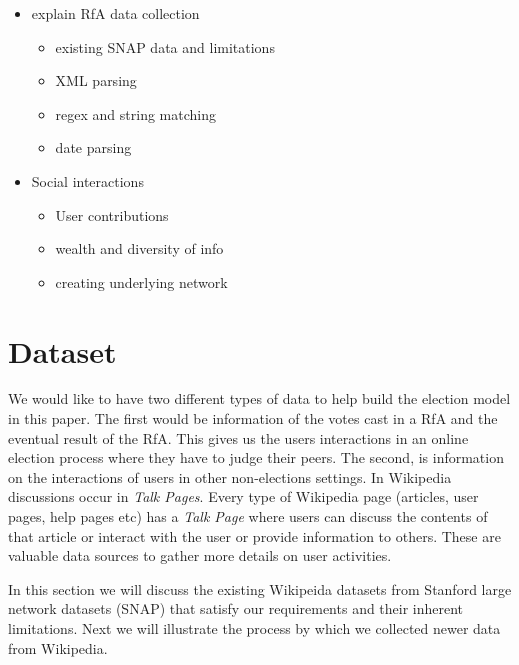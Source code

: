 \begin{itemize}
    \item explain RfA data collection 
    \begin{itemize}
        \item existing SNAP data and limitations
        \item XML parsing 
        \item regex and string matching 
        \item date parsing
    \end{itemize}
    \item Social interactions 
    \begin{itemize}
        \item User contributions
        \item wealth and diversity of info 
        \item creating underlying network
    \end{itemize}   
\end{itemize}

\section{Dataset}
\label{sec:dataset}

We would like to have two different types of data to help build the election model in this paper. The first would be information of the votes cast in a RfA and the eventual result of the RfA. This gives us the users interactions in an online election process where they have to judge their peers. The second, is information on the interactions of users in other non-elections settings. In Wikipedia discussions occur in \textit{Talk Pages}. Every type of Wikipedia page (articles, user pages, help pages etc) has a \textit{Talk Page} where users can discuss the contents of that article or interact with the user or provide information to others. These are valuable data sources to gather more details on user activities.
\smallskip

In this section we will discuss the existing Wikipeida datasets from Stanford large network datasets (SNAP) \cite{snapnets} that satisfy our requirements and their inherent limitations. Next we will illustrate the process by which we collected newer data from Wikipedia.

\newcommand{\wikirfa}{\textit{wiki-Rfa} }
\newcommand{\wikielect}{\textit{wiki-Elect} }
\newcommand{\wikitalk}{\textit{wiki-Talk} }


